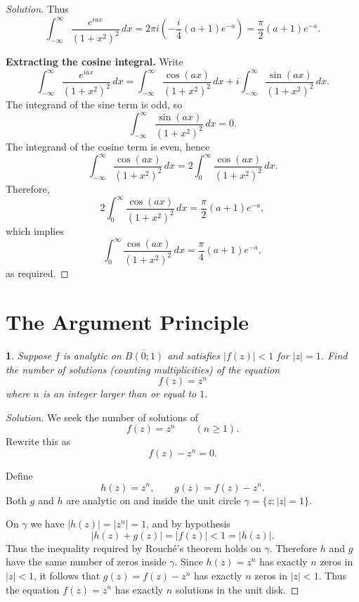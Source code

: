 \documentclass[12pt, a4paper]{report}
\theoremstyle{spaced}
\newtheorem{exercise}{}
\newcommand{\setexercise}[1]{\setcounter{exercise}{#1-1}}
\begin{document}
\begin{proof}[Solution]
	Thus
	\[
		\int_{-\infty}^{\infty} \frac{e^{iax}}{(1+x^{2})^{2}}\,dx
		= 2\pi i\left(-\frac{i}{4}(a+1)e^{-a}\right)
		= \frac{\pi}{2}(a+1)e^{-a}.
	\]

	\medskip

	\noindent\textbf{Extracting the cosine integral.}
	Write
	\[
		\int_{-\infty}^{\infty} \frac{e^{iax}}{(1+x^{2})^{2}}\,dx
		= \int_{-\infty}^{\infty} \frac{\cos(ax)}{(1+x^{2})^{2}}\,dx
		+ i\int_{-\infty}^{\infty} \frac{\sin(ax)}{(1+x^{2})^{2}}\,dx.
	\]
	The integrand of the sine term is odd, so
	\[
		\int_{-\infty}^{\infty} \frac{\sin(ax)}{(1+x^{2})^{2}}\,dx = 0.
	\]
	The integrand of the cosine term is even, hence
	\[
		\int_{-\infty}^{\infty} \frac{\cos(ax)}{(1+x^{2})^{2}}\,dx
		= 2\int_{0}^{\infty} \frac{\cos(ax)}{(1+x^{2})^{2}}\,dx.
	\]
	Therefore,
	\[
		2\int_{0}^{\infty} \frac{\cos(ax)}{(1+x^{2})^{2}}\,dx
		= \frac{\pi}{2}(a+1)e^{-a},
	\]
	which implies
	\[
		\int_{0}^{\infty} \frac{\cos(ax)}{(1+x^{2})^{2}}\,dx
		= \frac{\pi}{4}(a+1)e^{-a},
	\]
	as required.
\end{proof}

\section{The Argument Principle}
\setexercise{2}
\begin{exercise}
	Suppose \( f \) is analytic on \( \overline{B(0;1)} \) and satisfies
	\( |f(z)| < 1 \) for \( |z| = 1 \).
	Find the number of solutions (counting multiplicities) of the equation
	\[
		f(z) = z^{n}
	\]
	where \( n \) is an integer larger than or equal to \( 1 \).
\end{exercise}

\begin{proof}[Solution]
	We seek the number of solutions of
	\[
		f(z) = z^{n} \qquad (n \ge 1).
	\]
	Rewrite this as
	\[
		f(z) - z^{n} = 0.
	\]

	Define
	\[
		h(z) = z^{n}, \qquad g(z) = f(z) - z^{n}.
	\]
	Both $g$ and $h$ are analytic on and inside the unit circle
	$\gamma = \{z : |z| = 1\}$.

	On $\gamma$ we have $|h(z)| = |z^{n}| = 1$, and by hypothesis
	\[
		|h(z) + g(z)| = |f(z)| < 1 = |h(z)|.
	\]
	Thus the inequality required by Rouché’s theorem holds on $\gamma$.
	Therefore $h$ and $g$ have the same number of zeros inside $\gamma$.
	Since $h(z) = z^{n}$ has exactly $n$ zeros in $|z| < 1$,
	it follows that $g(z) = f(z) - z^{n}$ has exactly $n$ zeros in $|z| < 1$.
	Thus the equation $f(z) = z^{n}$ has exactly $n$ solutions in the unit disk.
\end{proof}
\end{document}

